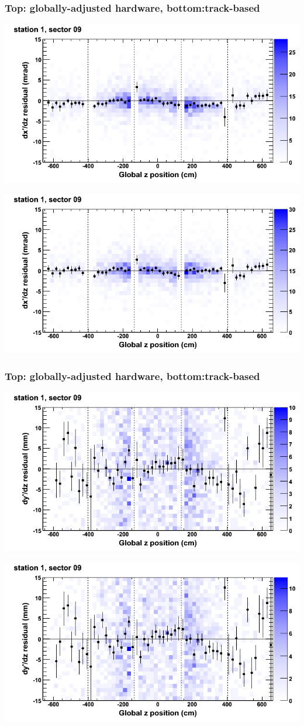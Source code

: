 \documentclass[compress]{beamer}
\begin{document}
\begin{frame}
\frametitle{Top: globally-adjusted hardware, bottom:track-based}
\includegraphics[width=0.7\linewidth]{NOV4_mapplots_HW/DTvsz_st1sec09_dxdz.png}

\includegraphics[width=0.7\linewidth]{NOV4_mapplots/DTvsz_st1sec09_dxdz.png}
\end{frame}

\begin{frame}
\frametitle{Top: globally-adjusted hardware, bottom:track-based}
\includegraphics[width=0.7\linewidth]{NOV4_mapplots_HW/DTvsz_st1sec09_dydz.png}

\includegraphics[width=0.7\linewidth]{NOV4_mapplots/DTvsz_st1sec09_dydz.png}
\end{frame}
\end{document}
